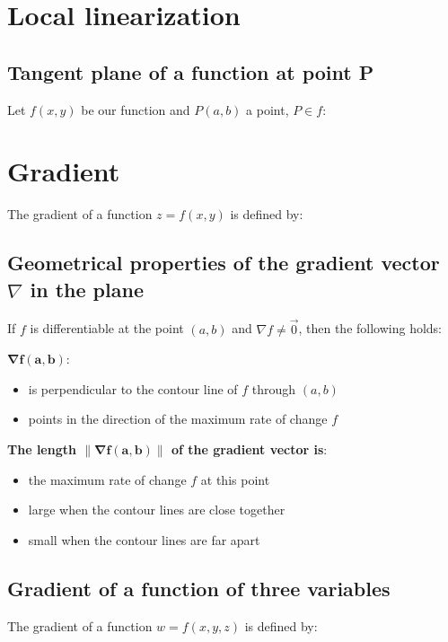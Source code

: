 \documentclass{article}
\begin{document}
\section{Local linearization}
\subsection{Tangent plane of a function at point P}
Let $f(x,y)$ be our function and $P(a,b)$ a point, $P \in f$:

\section{Gradient}
The gradient of a function $z=f(x,y)$ is defined by:


\newpage
\subsection{Geometrical properties of the gradient vector $\nabla$ in the plane}
If $f$ is differentiable at the point $(a,b)$ and $\nabla f \neq \overrightarrow{0}$,
then the following holds:

$\mathbf{\nabla f(a,b)}$:
\begin{itemize}
    \item is perpendicular to the contour line of $f$ through $(a,b)$
    \item points in the direction of the maximum rate of change $f$
\end{itemize}

\textbf{The length $\mathbf{\left\lVert\nabla f(a,b)\right\rVert}$ of the gradient vector is}:
\begin{itemize}
    \item the maximum rate of change $f$ at this point
    \item large when the contour lines are close together
    \item small when the contour lines are far apart
\end{itemize}

\subsection{Gradient of a function of three variables}
The gradient of a function $w = f(x,y,z)$ is defined by:
\end{document}
